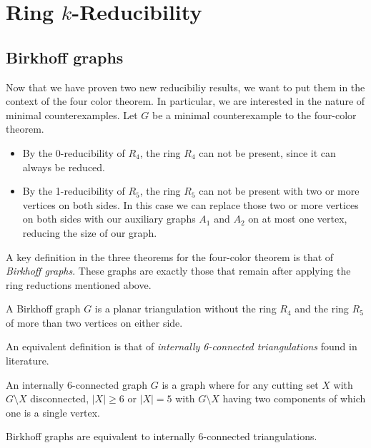 \section{Ring $k$-Reducibility}
\label{sec:birkhoff}

\subsection{Birkhoff graphs}

Now that we have proven two new reducibiliy results, we want to put them in the context of the four color theorem. In particular, we are interested in the nature of minimal counterexamples. Let $G$ be a minimal counterexample to the four-color theorem.

\begin{itemize}
    \item By the 0-reducibility of $R_4$, the ring $R_4$ can not be present, since it can always be reduced. 
    \item By the 1-reducibility of $R_5$, the ring $R_5$ can not be present with two or more vertices on both sides. In this case we can replace those two or more vertices on both sides with our auxiliary graphs $A_1$ and $A_2$ on at most one vertex, reducing the size of our graph.
\end{itemize}

A key definition in the three theorems for the four-color theorem is that of \emph{Birkhoff graphs}. These graphs are exactly those that remain after applying the ring reductions mentioned above.

\begin{definition}
    A Birkhoff graph $G$ is a planar triangulation without the ring $R_4$ and the ring $R_5$ of more than two vertices on either side.
\end{definition}

An equivalent definition is that of \emph{internally 6-connected triangulations} found in literature.

\begin{definition}
    An internally 6-connected graph $G$ is a graph where for any cutting set $X$ with $G\setminus X$ disconnected, $|X| \geq 6$ or $|X|=5$ with $G\setminus X$ having two components of which one is a single vertex.
\end{definition}

\begin{theorem}
    Birkhoff graphs are equivalent to internally 6-connected triangulations.
\end{theorem}

